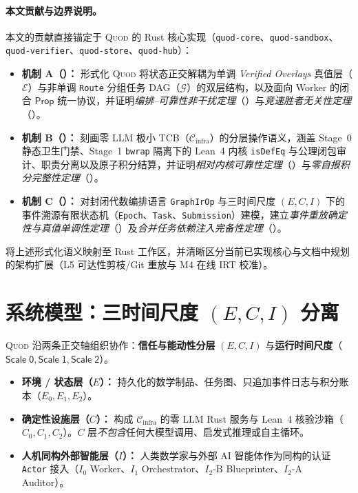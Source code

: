 \documentclass[10pt,a4paper,fontset=fandol]{ctexart}
\newcommand{\Cinfra}{\mathcal{C}_{\mathrm{infra}}}
\newcommand{\Truth}{\mathcal{E}}
\newcommand{\Orch}{\mathcal{G}}
\newcommand{\Prop}{\mathsf{Prop}}
\newcommand{\kw}[1]{\mathsf{#1}}
\newcommand{\code}[1]{\texttt{#1}}
\begin{document}
\paragraph{本文贡献与边界说明。}
本文的贡献直接锚定于 \textsc{Quod} 的 Rust 核心实现（\code{quod-core}、\code{quod-sandbox}、\code{quod-verifier}、\code{quod-store}、\code{quod-hub}）：
\begin{itemize}
  \item \textbf{机制 A（）：} 形式化 \textsc{Quod} 将状态正交解耦为单调 \emph{Verified Overlays} 真值层（$\Truth$）与非单调 \code{Route} 分组任务 DAG（$\Orch$）的双层结构，以及面向 Worker 的闭合 $\Prop$ 统一协议，并证明\emph{编排--可靠性非干扰定理}（）与\emph{竞速胜者无关性定理}（）。
  \item \textbf{机制 B（）：} 刻画零 LLM 极小 TCB（$\Cinfra$）的分层操作语义，涵盖 Stage~0 静态卫生门禁、Stage~1 \code{bwrap} 隔离下的 Lean~4 内核 \code{isDefEq} 与公理闭包审计、职责分离以及原子积分结算，并证明\emph{相对内核可靠性定理}（）与\emph{零自报积分完整性定理}（）。
  \item \textbf{机制 C（）：} 对封闭代数编排语言 \code{GraphIrOp} 与三时间尺度 $(E, C, I)$ 下的事件溯源有限状态机（\code{Epoch}、\code{Task}、\code{Submission}）建模，建立\emph{事件重放确定性与真值单调性定理}（）及\emph{合并任务依赖注入完备性定理}（）。
\end{itemize}
 将上述形式化语义映射至 Rust 工作区，并清晰区分当前已实现核心与文档中规划的架构扩展（L5 可达性剪枝/Git 重放与 M4 在线 IRT 校准）。

\section{系统模型：三时间尺度 $(E, C, I)$ 分离}\label{sec:model}

\textsc{Quod} 沿两条正交轴组织协作：\textbf{信任与能动性分层} $(E, C, I)$ 与\textbf{运行时间尺度}（$\kw{Scale\;0}, \kw{Scale\;1}, \kw{Scale\;2}$）。

\begin{itemize}
  \item \textbf{环境 / 状态层（$E$）：} 持久化的数学制品、任务图、只追加事件日志与积分账本（$E_0, E_1, E_2$）。
  \item \textbf{确定性设施层（$C$）：} 构成 $\Cinfra$ 的零 LLM Rust 服务与 Lean~4 核验沙箱（$C_0, C_1, C_2$）。$C$ 层\emph{不包含}任何大模型调用、启发式推理或自主循环。
  \item \textbf{人机同构外部智能层（$I$）：} 人类数学家与外部 AI 智能体作为同构的认证 \code{Actor} 接入（$I_0$ Worker、$I_1$ Orchestrator、$I_2\text{-B}$ Blueprinter、$I_2\text{-A}$ Auditor）。
\end{itemize}
\end{document}
